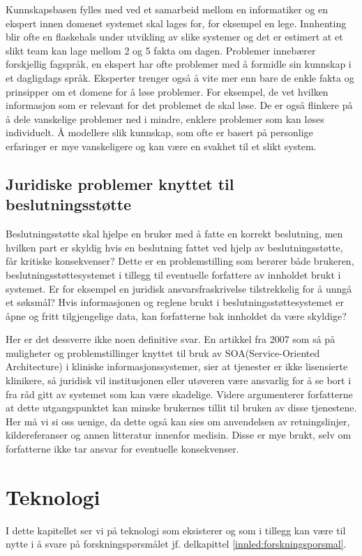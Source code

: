 Kunnskapsbasen fylles med ved et samarbeid mellom en informatiker og en ekspert innen domenet systemet skal lages for, for eksempel en lege. Innhenting blir ofte en flaskehals under utvikling av slike systemer og det er estimert at et slikt team kan lage mellom 2 og 5 fakta om dagen. Problemer innebærer forskjellig fagspråk, en ekspert har ofte problemer med å formidle sin kunnskap i et dagligdags språk. Eksperter trenger også å vite mer enn bare de enkle fakta og prinsipper om et domene for å løse problemer. For eksempel, de vet hvilken informasjon som er relevant for det problemet de skal løse. De er også flinkere på å dele vanskelige problemer ned i mindre, enklere problemer som kan løses individuelt. Å modellere slik kunnskap, som ofte er basert på personlige erfaringer er mye vanskeligere og kan være en svakhet til et slikt system\citep[s.3-4]{intro_expertsystems}.

\subsection{Juridiske problemer knyttet til beslutningsstøtte}
Beslutningsstøtte skal hjelpe en bruker med å fatte en korrekt beslutning, men hvilken part er skyldig hvis en beslutning fattet ved hjelp av beslutningsstøtte, får kritiske konsekvenser?  Dette er en problemstilling som berører både brukeren, beslutningsstøttesystemet i tillegg til eventuelle forfattere av innholdet brukt i systemet. Er for eksempel en juridisk ansvarsfraskrivelse tilstrekkelig for å unngå et søksmål? Hvis informasjonen og reglene brukt i beslutningsstøttesystemet er åpne og fritt tilgjengelige data, kan forfatterne bak innholdet da være skyldige?

Her er det dessverre ikke noen definitive svar. En artikkel fra 2007 som så på muligheter og problemstillinger knyttet til bruk av SOA(Service-Oriented Architecture) i kliniske informasjonssystemer,  
sier at tjenester er ikke lisensierte klinikere, så juridisk vil institusjonen eller utøveren være ansvarlig for å se bort i fra råd gitt av systemet som kan være skadelige\citep{SOA_DSS}. Videre argumenterer forfatterne at dette utgangspunktet kan minske brukernes tillit til bruken av disse tjenestene. Her må vi si oss uenige, da dette også kan sies om anvendelsen av retningslinjer, kildereferanser og annen litteratur innenfor medisin. Disse er mye brukt, selv om forfatterne ikke tar ansvar for eventuelle konsekvenser.

\section{Teknologi}
I dette kapitellet ser vi på teknologi som eksisterer og som i tillegg kan være til nytte i å svare på forskningspørsmålet jf. delkapittel \ref{innled:forskningsporsmal}. 
